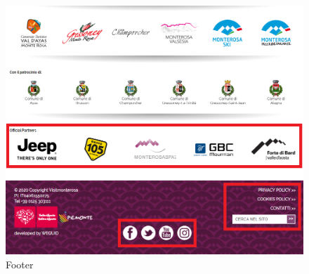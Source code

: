 \begin{figure}[h!]
	\hfill
	\begin{minipage}[b]{0.65\textwidth}
    		\includegraphics[width=\textwidth]{./assets/Interaction-bottom-bar.png}
		\caption{Footer}
	\end{minipage}
\end{figure}
\FloatBarrier

